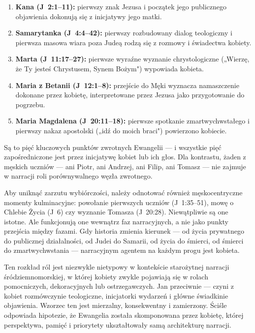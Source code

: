 \begin{enumerate}
\item \textbf{Kana (J~2:1--11):} pierwszy znak Jezusa i początek jego publicznego objawienia dokonują się z inicjatywy jego matki.

\item \textbf{Samarytanka (J~4:4--42):} pierwszy rozbudowany dialog teologiczny i pierwsza masowa wiara poza Judeą rodzą się z rozmowy i świadectwa kobiety.

\item \textbf{Marta (J~11:17--27):} pierwsze wyraźne wyznanie chrystologiczne („Wierzę, że Ty jesteś Chrystusem, Synem Bożym") wypowiada kobieta.

\item \textbf{Maria z Betanii (J~12:1--8):} przejście do Męki wyznacza namaszczenie dokonane przez kobietę, interpretowane przez Jezusa jako przygotowanie do pogrzebu.

\item \textbf{Maria Magdalena (J~20:11--18):} pierwsze spotkanie zmartwychwstałego i pierwszy nakaz apostolski („idź do moich braci") powierzono kobiecie.
\end{enumerate}

Są to pięć kluczowych punktów zwrotnych Ewangelii — i wszystkie pięć zapośredniczone jest przez inicjatywę kobiet lub ich głos.
Dla kontrastu, żaden z męskich uczniów — ani Piotr, ani Andrzej, ani Filip, ani Tomasz — nie zajmuje w narracji roli porównywalnego węzła zwrotnego.

Aby uniknąć zarzutu wybiórczości, należy odnotować również męskocentryczne momenty kulminacyjne: powołanie pierwszych uczniów (J~1:35--51), mowę o Chlebie Życia (J~6) czy wyznanie Tomasza (J~20:28).
Niewątpliwie są one istotne.
Ale funkcjonują one wewnątrz faz narracyjnych, a nie jako punkty przejścia między fazami.
Gdy historia zmienia kierunek — od życia prywatnego do publicznej działalności, od Judei do Samarii, od życia do śmierci, od śmierci do zmartwychwstania — narracyjnym agentem na każdym progu jest kobieta.

Ten rozkład ról jest niezwykle nietypowy w kontekście starożytnej narracji śródziemnomorskiej, w której kobiety zwykle pojawiają się w rolach pomocniczych, dekoracyjnych lub ostrzegawczych.
Jan przeciwnie — czyni z kobiet rozmówczynie teologiczne, inicjatorki wydarzeń i główne świadkinie objawienia.
Wzorzec ten jest mierzalny, konsekwentny i zamierzony.
Ściśle odpowiada hipotezie, że Ewangelia została skomponowana przez kobietę, której perspektywa, pamięć i priorytety ukształtowały samą architekturę narracji.

